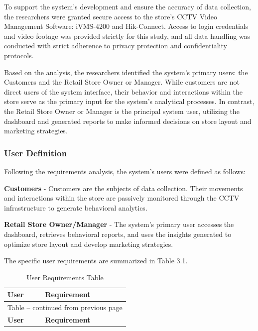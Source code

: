 {To support the system’s development and ensure the accuracy of data collection, the researchers were granted secure access to the store's CCTV Video Management Software: iVMS-4200 and Hik-Connect. Access to login credentials and video footage was provided strictly for this study, and all data handling was conducted with strict adherence to privacy protection and confidentiality protocols.

Based on the analysis, the researchers identified the system’s primary users: the Customers and the Retail Store Owner or Manager. While customers are not direct users of the system interface, their behavior and interactions within the store serve as the primary input for the system’s analytical processes. In contrast, the Retail Store Owner or Manager is the principal system user, utilizing the dashboard and generated reports to make informed decisions on store layout and marketing strategies.

\subsubsection{User Definition}

Following the requirements analysis, the system's users were defined as follows:

\textbf{Customers} - Customers are the subjects of data collection. Their movements and interactions within the store are passively monitored through the CCTV infrastructure to generate behavioral analytics.

\textbf{Retail Store Owner/Manager} - The system’s primary user accesses the dashboard, retrieves behavioral reports, and uses the insights generated to optimize store layout and develop marketing strategies.

The specific user requirements are summarized in Table 3.1.

{
	\begin{longtable}{|p{4cm}|p{11cm}|}
		\caption[User Requirements Table]{\newline \newline User Requirements Table} \label{tab:user-requirements} \\
		\hline
		\textbf{User} & \textbf{Requirement} \\
		\hline
		\endfirsthead
		
		\multicolumn{2}{c}{Table \thetable{} -- continued from previous page} \\
		\hline
		\textbf{User} & \textbf{Requirement} \\
		\hline
		\endhead
		

\end{longtable}}}

